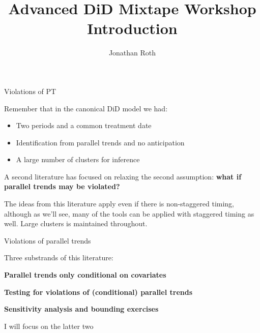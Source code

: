 \documentclass[aspectratio = 169, 13pt]{beamer}
\author{Jonathan Roth}
\title[Advanced DiD Mixtape Workshop]{Advanced DiD Mixtape Workshop \\ Introduction}
\begin{document}

\begin{frame}{Violations of PT}
  \addtocounter{framenumber}{-1}
	\begin{wideitemize}
		\item
		Remember that in the canonical DiD model we had:
		    
		\begin{itemize}
			\item 
			      Two periods and a common treatment date
			              
			\item
			      Identification from parallel trends and no anticipation
			              
			\item
			      A large number of clusters for inference
		\end{itemize}
		    
		\item
		A second literature has focused on relaxing the second assumption: \textbf{what if parallel trends may be violated?}
		    
		\item
		The ideas from this literature apply even if there is non-staggered timing, although as we'll see, many of the tools can be applied with staggered timing as well. Large clusters is maintained throughout. 
		    
	\end{wideitemize}
	
\end{frame}




\begin{frame}{Violations of parallel trends}
	\begin{wideitemize}
		
		
		\item
		Three substrands of this literature: \\
		\medskip 
		\begin{wideitemize}
			
			{\normalsize
				\item
				\textbf{Parallel trends only conditional on covariates} \\
				
				\item
				\textbf{Testing for violations of (conditional) parallel trends}\\
				
				\item
				\textbf{Sensitivity analysis and bounding exercises}
			}
			
		\end{wideitemize}
		
		\item
		I will focus on the latter two
		
	\end{wideitemize}
\end{frame}
\end{document}
